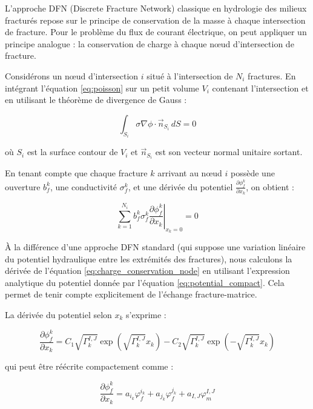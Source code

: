 L'approche DFN (Discrete Fracture Network) classique en hydrologie des milieux fracturés repose sur le principe de conservation de la masse à chaque intersection de fracture. Pour le problème du flux de courant électrique, on peut appliquer un principe analogue : la conservation de charge à chaque nœud d'intersection de fracture.

Considérons un nœud d'intersection $i$ situé à l'intersection de $N_i$ fractures. En intégrant l'équation \eqref{eq:poisson} sur un petit volume $V_i$ contenant l'intersection et en utilisant le théorème de divergence de Gauss :

\begin{equation}
\int_{S_i} \sigma \nabla \phi \cdot \vec{n}_{S_i} \, dS = 0
\label{eq:gauss}
\end{equation}

où $S_i$ est la surface contour de $V_i$ et $\vec{n}_{S_i}$ est son vecteur normal unitaire sortant.

En tenant compte que chaque fracture $k$ arrivant au nœud $i$ possède une ouverture $b_f^k$, une conductivité $\sigma_f^k$, et une dérivée du potentiel $\frac{\partial \phi_f^k}{\partial x_k}$, on obtient :

\begin{equation}
\sum_{k=1}^{N_i} b_f^k \sigma_f^k \left.\frac{\partial \phi_f^k}{\partial x_k}\right|_{x_k=0} = 0
\label{eq:charge_conservation_node}
\end{equation}

À la différence d'une approche DFN standard (qui suppose une variation linéaire du potentiel hydraulique entre les extrémités des fractures), nous calculons la dérivée de l'équation \eqref{eq:charge_conservation_node} en utilisant l'expression analytique du potentiel donnée par l'équation \eqref{eq:potential_compact}. Cela permet de tenir compte explicitement de l'échange fracture-matrice.

La dérivée du potentiel selon $x_k$ s'exprime :

\begin{equation}
\frac{\partial \phi_f^k}{\partial x_k} = C_1 \sqrt{\Gamma_k^{I,J}} \exp(\sqrt{\Gamma_k^{I,J}} x_k) - C_2 \sqrt{\Gamma_k^{I,J}} \exp(-\sqrt{\Gamma_k^{I,J}} x_k)
\label{eq:potential_derivative}
\end{equation}

qui peut être réécrite compactement comme :

\begin{equation}
\frac{\partial \phi_f^k}{\partial x_k} = a_{i_k} \varphi_f^{i_k} + a_{j_k} \varphi_f^{j_k} + a_{I,J} \varphi_m^{I,J}
\label{eq:potential_derivative_compact}
\end{equation}

